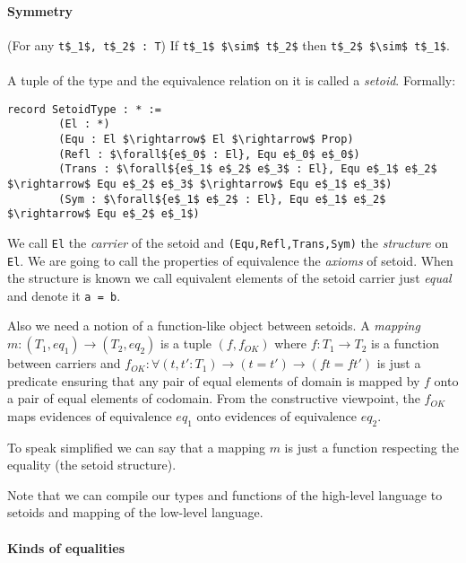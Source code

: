 \documentclass[11pt,oneside]{article}
\begin{document}
\paragraph{Symmetry}
(For any \lstinline[mathescape=true]|t$_1$, t$_2$ : T|) If
\lstinline[mathescape=true]|t$_1$ $\sim$ t$_2$| then
\lstinline[mathescape=true]|t$_2$ $\sim$ t$_1$|.

\paragraph{}
A tuple of the type and the equivalence relation on it is called
a {\em setoid}.
Formally:

\begin{lstlisting}[mathescape=true]
    record SetoidType : * :=
        (El : *)
        (Equ : El $\rightarrow$ El $\rightarrow$ Prop)
        (Refl : $\forall${e$_0$ : El}, Equ e$_0$ e$_0$)
        (Trans : $\forall${e$_1$ e$_2$ e$_3$ : El}, Equ e$_1$ e$_2$ $\rightarrow$ Equ e$_2$ e$_3$ $\rightarrow$ Equ e$_1$ e$_3$)
        (Sym : $\forall${e$_1$ e$_2$ : El}, Equ e$_1$ e$_2$ $\rightarrow$ Equ e$_2$ e$_1$)
\end{lstlisting}
We call \lstinline[mathescape=true]|El| the {\em carrier} of the setoid and \lstinline[mathescape=true]|(Equ,Refl,Trans,Sym)| the {\em structure} on \lstinline[mathescape=true]|El|.
We are going to call the properties of equivalence the {\em axioms} of setoid.
When the structure is known we call equivalent elements
of the setoid carrier just {\em equal} and denote it \lstinline[mathescape=true]|a = b|.

Also we need a notion of a function-like object between setoids.
A {\em mapping} $m : (T_1, eq_1) \rightarrow (T_2, eq_2)$ is a tuple
$(f, f_{OK})$ where $f : T_1 \rightarrow T_2$ is a function between carriers and
$f_{OK} : \forall (t, t' : T_1) \rightarrow (t = t') \rightarrow (f t = f t')$
is just a predicate ensuring that any pair of equal elements of domain
is mapped by $f$ onto a pair of equal elements of codomain.
From the constructive viewpoint, the $f_{OK}$ maps evidences of
equivalence $eq_1$ onto evidences of equivalence $eq_2$.

To speak simplified we can say that a mapping $m$ is just a function
respecting the equality (the setoid structure).

Note that we can compile our types and functions of the high-level language to setoids and mapping of the low-level language.

\paragraph{Kinds of equalities}
\end{document}
